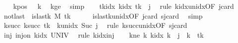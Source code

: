 \begin{isabellebody}
\ \ \isamarkupfalse%
\ kpos{\isacharcolon}{\kern0pt}\ {\isachardoublequoteopen}{}\ {\isacharless}{\kern0pt}\ {\isacharquery}{\kern0pt}k{\isachardoublequoteclose}\ \isamarkupfalse%
\ kge{}\ \isamarkupfalse%
\ simp\isanewline
\ \ \isamarkupfalse%
\ tkidx{\isacharcolon}{\kern0pt}\ {\isachardoublequoteopen}k{\isacharunderscore}{\kern0pt}idx\ {\isacharquery}{\kern0pt}tk\ {\isacharequal}{\kern0pt}\ j{\isachardoublequoteclose}\ \isamarkupfalse%
\ {\isacharparenleft}{\kern0pt}rule\ k{\isacharunderscore}{\kern0pt}idx{\isacharunderscore}{\kern0pt}unidx{\isacharbrackleft}{\kern0pt}OF\ jcard{\isacharbrackright}{\kern0pt}{\isacharparenright}{\kern0pt}\isanewline
\ \ \isamarkupfalse%
\ notlast{\isacharcolon}{\kern0pt}\ {\isachardoublequoteopen}{\isasymnot}\ is{\isacharunderscore}{\kern0pt}last{\isacharunderscore}{\kern0pt}k\ M\ {\isacharquery}{\kern0pt}tk{\isachardoublequoteclose}\isanewline
\ \ \ \ \isamarkupfalse%
\ is{\isacharunderscore}{\kern0pt}last{\isacharunderscore}{\kern0pt}k{\isacharunderscore}{\kern0pt}unidx{\isacharbrackleft}{\kern0pt}OF\ jcard{\isacharbrackright}{\kern0pt}\ sjcard\ \isamarkupfalse%
\ simp\isanewline
\ \ \isamarkupfalse%
\ ksucc{\isacharcolon}{\kern0pt}\ {\isachardoublequoteopen}k{\isacharunderscore}{\kern0pt}succ\ {\isacharquery}{\kern0pt}tk\ {\isacharequal}{\kern0pt}\ k{\isacharunderscore}{\kern0pt}unidx\ {\isacharparenleft}{\kern0pt}Suc\ j{\isacharparenright}{\kern0pt}{\isachardoublequoteclose}\ \isamarkupfalse%
\ {\isacharparenleft}{\kern0pt}rule\ k{\isacharunderscore}{\kern0pt}succ{\isacharunderscore}{\kern0pt}unidx{\isacharbrackleft}{\kern0pt}OF\ sjcard{\isacharbrackright}{\kern0pt}{\isacharparenright}{\kern0pt}\isanewline
\ \ \isamarkupfalse%
\ inj{\isacharcolon}{\kern0pt}\ {\isachardoublequoteopen}inj{\isacharunderscore}{\kern0pt}on\ k{\isacharunderscore}{\kern0pt}idx\ UNIV{\isachardoublequoteclose}\ \isamarkupfalse%
\ {\isacharparenleft}{\kern0pt}rule\ k{\isacharunderscore}{\kern0pt}idx{\isacharunderscore}{\kern0pt}inj{\isacharparenright}{\kern0pt}\isanewline
\ \ \isamarkupfalse%
\ kne{\isacharcolon}{\kern0pt}\ {\isachardoublequoteopen}{\isasymAnd}k{\isachardot}{\kern0pt}\ k{\isacharunderscore}{\kern0pt}idx\ k\ {\isacharequal}{\kern0pt}\ j\ {\isasymLongrightarrow}\ k\ {\isacharequal}{\kern0pt}\ {\isacharquery}{\kern0pt}tk{\isachardoublequoteclose}\isanewline
\ \ \isamarkupfalse%

\end{isabellebody}
